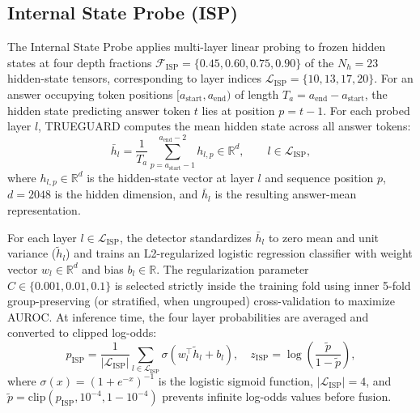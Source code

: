 \documentclass{ieeeaccess}
\begin{document}
\subsection{Internal State Probe (ISP)}
The Internal State Probe applies multi-layer linear probing \cite{review27} to frozen hidden states at four depth fractions $\mathcal{F}_{\text{ISP}} = \{0.45, 0.60, 0.75, 0.90\}$ of the $N_h = 23$ hidden-state tensors, corresponding to layer indices $\mathcal{L}_{\text{ISP}} = \{10, 13, 17, 20\}$. For an answer occupying token positions $[a_{\text{start}}, a_{\text{end}})$ of length $T_a = a_{\text{end}} - a_{\text{start}}$, the hidden state predicting answer token $t$ lies at position $p = t - 1$. For each probed layer $l$, TRUEGUARD computes the mean hidden state across all answer tokens:
\begin{equation}
\bar{h}_l = \frac{1}{T_a} \sum_{p = a_{\text{start}} - 1}^{a_{\text{end}} - 2} h_{l,p} \in \mathbb{R}^{d}, \qquad l \in \mathcal{L}_{\text{ISP}},
\label{eq:isp_mean}
\end{equation}
where $h_{l,p} \in \mathbb{R}^{d}$ is the hidden-state vector at layer $l$ and sequence position $p$, $d = 2048$ is the hidden dimension, and $\bar{h}_l$ is the resulting answer-mean representation.

For each layer $l \in \mathcal{L}_{\text{ISP}}$, the detector standardizes $\bar{h}_l$ to zero mean and unit variance ($\tilde{h}_l$) and trains an L2-regularized logistic regression classifier with weight vector $w_l \in \mathbb{R}^{d}$ and bias $b_l \in \mathbb{R}$. The regularization parameter $C \in \{0.001, 0.01, 0.1\}$ is selected strictly inside the training fold using inner 5-fold group-preserving (or stratified, when ungrouped) cross-validation to maximize AUROC. At inference time, the four layer probabilities are averaged and converted to clipped log-odds:
\begin{equation}
p_{\text{ISP}} = \frac{1}{|\mathcal{L}_{\text{ISP}}|} \sum_{l \in \mathcal{L}_{\text{ISP}}} \sigma\!\left(w_l^\top \tilde{h}_l + b_l\right), \quad z_{\text{ISP}} = \log\!\left(\frac{\tilde{p}}{1 - \tilde{p}}\right),
\label{eq:isp_prob}
\end{equation}
where $\sigma(x) = (1 + e^{-x})^{-1}$ is the logistic sigmoid function, $|\mathcal{L}_{\text{ISP}}| = 4$, and $\tilde{p} = \text{clip}(p_{\text{ISP}}, 10^{-4}, 1 - 10^{-4})$ prevents infinite log-odds values before fusion.
\end{document}
